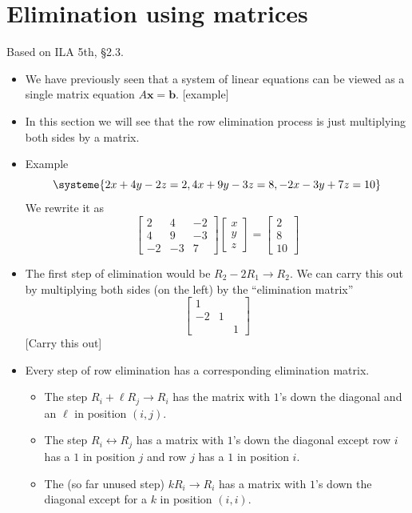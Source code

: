 \documentclass[11pt,oneside]{amsbook}
\theoremstyle{definition}
\theoremstyle{plain}
\theoremstyle{definition}
\theoremstyle{remark}
\numberwithin{equation}{section}
\numberwithin{figure}{section}
\begin{document}
\newpage
\section{Elimination using matrices}

Based on ILA 5th, \S 2.3.

\begin{itemize}
\item We have previously seen that a system of linear equations can be viewed as a single matrix equation $A\mathbf{x}=\mathbf{b}$. [example]
\item In this section we will see that the row elimination process is just multiplying both sides by a matrix.
\item Example
  \[\systeme{2x+4y-2z=2,4x+9y-3z=8,-2x-3y+7z=10}
  \]
  We rewrite it as
  \[\begin{bmatrix}2&4&-2\\4&9&-3\\-2&-3&7\end{bmatrix}
    \begin{bmatrix}x\\y\\z\end{bmatrix}
    =\begin{bmatrix}2\\8\\10\end{bmatrix}
  \]
\item The first step of elimination would be $R_2-2R_1\to R_2$. We can carry this out by multiplying both sides (on the left) by the ``elimination matrix''
  \[\begin{bmatrix}1&&\\-2&1&\\&&1\end{bmatrix}
  \]
  [Carry this out]
\item Every step of row elimination has a corresponding elimination matrix.
  \begin{itemize}
  \item The step $R_i+\ell R_j\to R_i$ has the matrix with $1$'s down the diagonal and an $\ell$ in position $(i,j)$.
  \item The step $R_i\leftrightarrow R_j$ has a matrix with $1$'s down the diagonal except row $i$ has a $1$ in position $j$ and row $j$ has a $1$ in position $i$.
  \item The (so far unused step) $kR_i\to R_i$ has a matrix with $1$'s down the diagonal except for a $k$ in position $(i,i)$.

\end{itemize}
\end{itemize}
\end{document}

